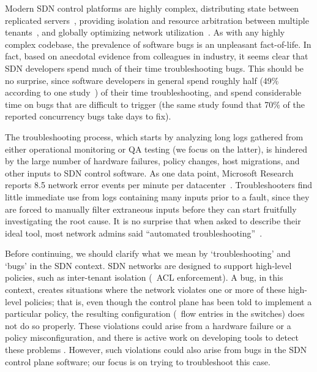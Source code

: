 Modern SDN control platforms are highly complex,
distributing state between replicated
servers~\cite{floodlight},
providing isolation and resource arbitration between multiple
tenants~\cite{Casado:2010:VNF:1921151.1921162}, and
globally optimizing network utilization~\cite{urs}.
As with any highly complex codebase, the prevalence of software bugs is an unpleasant fact-of-life.
In fact, based on anecdotal evidence from colleagues in industry, it seems clear that
SDN developers spend much of their time
troubleshooting bugs. This should be no surprise, since software developers in
general spend roughly half (49\% according to one
study~\cite{msoft_concurrency}) of their time troubleshooting, and spend
considerable time on bugs that are difficult to trigger
(the same study found that 70\% of the reported concurrency bugs
take days to fix).

The troubleshooting process, which starts by analyzing long logs gathered from either operational monitoring or QA testing
(we focus on the latter), is hindered by the large number of hardware failures,
policy changes, host migrations, and other inputs to SDN control software.
As one data point, Microsoft Research
reports 8.5 network error events per minute per
datacenter~\cite{Greenberg:2009:VSF:1592568.1592576}.
Troubleshooters find little immediate use from logs containing many inputs
prior to a fault,
since they are forced to manually filter extraneous inputs
before they can start fruitfully investigating the root cause.
It is no surprise that when asked to describe their
ideal tool, most network admins said ``automated troubleshooting''~\cite{Zeng:Survey}.


Before continuing, we should clarify what we mean by `troubleshooting' and `bugs' in the SDN context.
SDN networks are designed to support high-level policies, such as inter-tenant
isolation (\ie~ACL enforcement). A bug, in this context, creates situations
where the network violates one or more of these high-level policies; that is, even though the control plane
has been told to implement a particular policy, the resulting configuration (\ie~flow entries in the switches)
does not do so properly. %
These violations could arise from a hardware failure or a policy misconfiguration, and there is active work on developing tools to detect these problems \cite{hsa,Zeng:2012:ATP:2413176.2413205}. However, such violations could also arise from bugs in the SDN control plane software;  our focus is on trying to troubleshoot this case.

